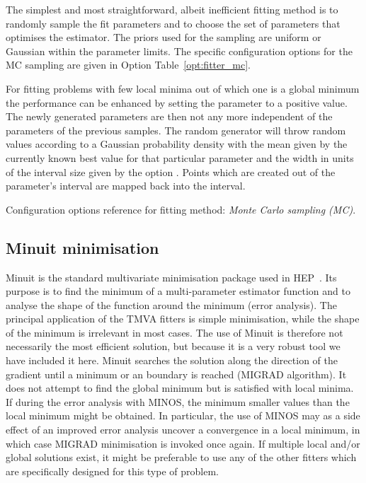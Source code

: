 The simplest and most straightforward, albeit inefficient fitting method is to randomly 
sample the fit parameters and to choose the set of parameters that optimises the estimator. 
The priors
used for the sampling are uniform or Gaussian within the parameter limits. The specific 
configuration options for the MC sampling are given in Option Table~\ref{opt:fitter_mc}. 

For fitting problems
with few local minima out of which one is a global minimum the performance can be enhanced
by setting the parameter  to a positive value. The newly generated parameters
are then not any more independent of the parameters of the previous samples. The random 
generator will throw random values according to a Gaussian probability density 
with the mean given by the currently known best value for that particular parameter and 
the width in units of the interval size given by the option .
Points which are created out of the parameter's interval are mapped back 
into the interval.
\begin{option}[t]

\caption[.]{\optionCaptionSize 
     Configuration options reference for fitting method: {\em Monte Carlo sampling (MC)}.
}
\label{opt:fitter_mc}
\end{option}

\subsection{Minuit minimisation}
\label{sec:minuit}

Minuit is the standard multivariate minimisation package used in HEP~\cite{Minuit}.
Its purpose is to find the minimum of a multi-parameter estimator function 
and to analyse the shape of the function around the minimum (error analysis). The 
principal application of the TMVA fitters is simple minimisation, while the shape
of the minimum is irrelevant in most cases. The use of Minuit is therefore not 
necessarily the most efficient solution, but because it is a very robust tool we 
have included it here. Minuit searches the solution along the direction of the gradient 
until a minimum or an boundary is reached (MIGRAD algorithm). It 
does not attempt to find the global minimum but is satisfied with local minima.
If during the error analysis with MINOS, the minimum smaller values than the local 
minimum might be obtained. In particular, the use of MINOS may as a side effect of 
an improved error analysis uncover a convergence in a local minimum, in which case 
MIGRAD minimisation is invoked once again. If multiple local and/or global 
solutions exist, it might be preferable to use any of the other fitters which are 
specifically designed for this type of problem. 

